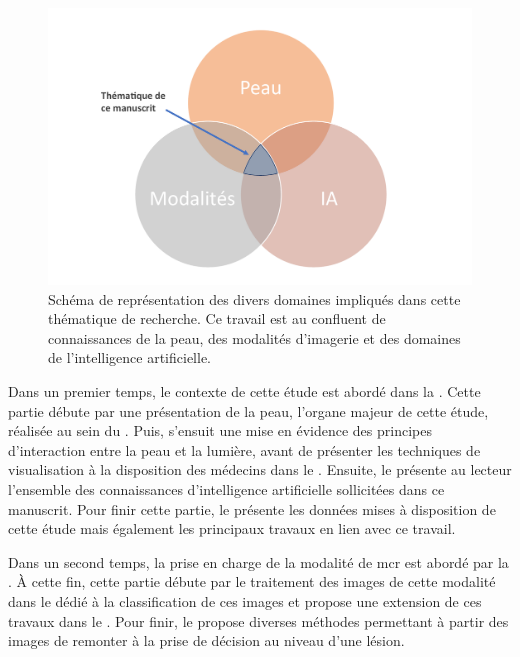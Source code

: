 \begin{figure}[H]
    \centering
    \includegraphics[width=0.8\linewidth]{contents/i_introduction/resources/scheme_our_work.pdf}
    \caption{Schéma de représentation des divers domaines impliqués dans cette thématique de recherche. Ce travail est au confluent de connaissances de la peau, des modalités d'imagerie et des domaines de l'intelligence artificielle.}
    \label{fig:scheme_our_work}
\end{figure}\par

Dans un premier temps, le contexte de cette étude est abordé dans la . Cette partie débute par une présentation de la peau, l'organe majeur de cette étude, réalisée au sein du . Puis, s'ensuit une mise en évidence des principes d'interaction entre la peau et la lumière, avant de présenter les techniques de visualisation à la disposition des médecins dans le . Ensuite, le  présente au lecteur l'ensemble des connaissances d'intelligence artificielle sollicitées dans ce manuscrit. Pour finir cette partie, le  présente les données mises à disposition de cette étude mais également les principaux travaux en lien avec ce travail.\par

Dans un second temps, la prise en charge de la modalité de \gls{mcr} est abordé par la . À cette fin, cette partie débute par le traitement des images de cette modalité dans le  dédié à la classification de ces images et propose une extension de ces travaux dans le . Pour finir, le  propose diverses méthodes permettant à partir des images de remonter à la prise de décision au niveau d'une lésion.\par

